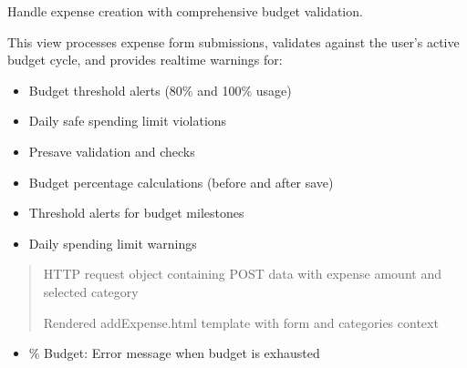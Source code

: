 \documentclass[letterpaper,10pt,english]{sphinxmanual}
\begin{document}
\begin{fulllineitems}
\label{\detokenize{expensesApp:expensesApp.views.addExpense}}
\pysigstartsignatures
\pysiglinewithargsret
{}
{}
{}
\pysigstopsignatures
\sphinxAtStartPar
Handle expense creation with comprehensive budget validation.

\sphinxAtStartPar
This view processes expense form submissions, validates against the user’s
active budget cycle, and provides real\sphinxhyphen{}time warnings for:
\begin{itemize}
\item {} 
\sphinxAtStartPar
Budget threshold alerts (80\% and 100\% usage)

\item {} 
\sphinxAtStartPar
Daily safe spending limit violations

\end{itemize}
\begin{description}
\begin{itemize}
\item {} 
\sphinxAtStartPar
Pre\sphinxhyphen{}save validation and checks

\item {} 
\sphinxAtStartPar
Budget percentage calculations (before and after save)

\item {} 
\sphinxAtStartPar
Threshold alerts for budget milestones

\item {} 
\sphinxAtStartPar
Daily spending limit warnings

\end{itemize}

\end{description}
\begin{quote}\begin{description}
\sphinxAtStartPar
{} \textendash{} HTTP request object containing POST data with expense amount
and selected category

\sphinxAtStartPar
Rendered addExpense.html template with form and categories context

\end{description}\end{quote}
\begin{description}
\begin{itemize}
\item {} 
\% Budget: Error message when budget is exhausted


\end{itemize}
\end{description}
\end{fulllineitems}
\end{document}
